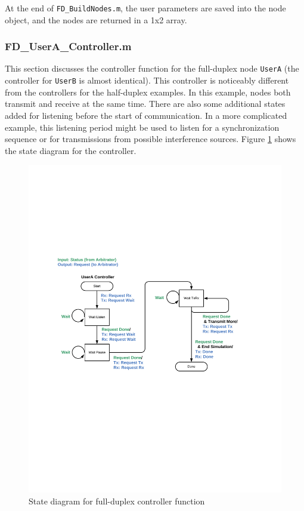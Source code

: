 At the end of \verb+FD_BuildNodes.m+, the user parameters are saved
into the node object, and the nodes are returned in a 1x2 array.

\subsubsection{FD\_UserA\_Controller.m}

This section discusses the controller function for the full-duplex
node \verb+UserA+ (the controller for \verb+UserB+ is almost
identical).  This controller is noticeably different from the
controllers for the half-duplex examples.  In this example, nodes
both transmit and receive at the same time.  There are also some
additional states added for listening before the start of
communication.  In a more complicated example, this listening period
might be used to listen for a synchronization sequence or for
transmissions from possible interference sources.  Figure
\ref{fig:fdState} shows the state diagram for the controller.

\begin{figure}[h]
\centering
\includegraphics[width=5in]{figs/FD_State_Diagram}
\caption{State diagram for full-duplex controller function}
\label{fig:fdState}
\end{figure}

